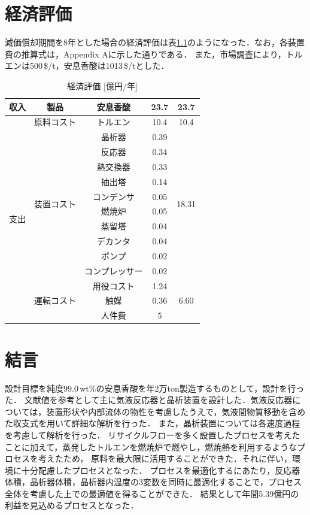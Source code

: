 \documentclass[a4j]{jsreport}
\begin{document}
\chapter{経済評価}
減価償却期間を8年とした場合の経済評価は表\ref{経済評価}のようになった．なお，各装置費の推算式は，Appendix Aに示した通りである．
また，市場調査により，トルエンは500\,\$/\si{\tonne}，安息香酸は1013\,\$/\si{\tonne}とした．
\begin{table}[htbp]
    \centering
    \caption{経済評価 [億円/年]}
    \label{経済評価}
    \begin{tabular}{c|c|cc|c}
      \hline
      収入 & 製品 & 安息香酸 & 23.7 & 23.7 \\
      \hline
      \multirow{14}{*}{支出} & 原料コスト & トルエン & 10.4 & 10.4 \\
      \cline{2-5}
      & \multirow{10}{*}{装置コスト} & 晶析器 & 0.39 & \multirow{10}{*}{18.31} \\
      & & 反応器 & 0.34 & \\
      & & 熱交換器 & 0.33 & \\
      & & 抽出塔 & 0.14 & \\
      & & コンデンサ & 0.05 & \\
      & & 燃焼炉 & 0.05 & \\
      & & 蒸留塔 & 0.04 & \\
      & & デカンタ & 0.04 & \\
      & & ポンプ & 0.02 & \\
      & & コンプレッサー & 0.02 & \\
      \cline{2-5}
      & \multirow{3}{*}{運転コスト} & 用役コスト & 1.24 & \multirow{3}{*}{6.60} \\
      & & 触媒 & 0.36 & \\
      & & 人件費 & 5 & \\
      \hline
    \end{tabular}
\end{table}


\clearpage
\chapter{結言}
設計目標を純度99.0\,wt\%の安息香酸を年2万ton製造するものとして，設計を行った．
文献値を参考として主に気液反応器と晶析装置を設計した．気液反応器については，装置形状や内部流体の物性を考慮したうえで，気液間物質移動を含めた収支式を用いて詳細な解析を行った．
また，晶析装置については各速度過程を考慮して解析を行った．
リサイクルフローを多く設置したプロセスを考えたことに加えて，蒸発したトルエンを燃焼炉で燃やし，燃焼熱を利用するようなプロセスを考えたため，
原料を最大限に活用することができた．それに伴い，環境に十分配慮したプロセスとなった．
プロセスを最適化するにあたり，反応器体積，晶析器体積，晶析器内温度の3変数を同時に最適化することで，プロセス全体を考慮した上での最適値を得ることができた．
結果として年間5.39億円の利益を見込めるプロセスとなった．
\end{document}
